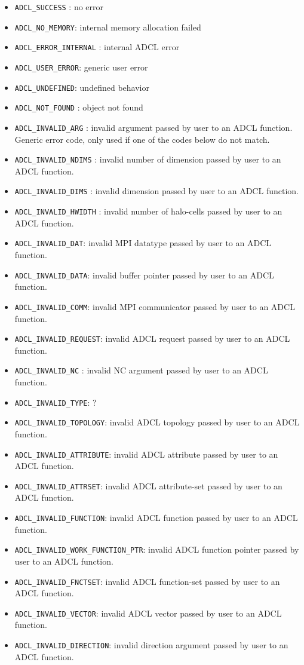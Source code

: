 \begin{itemize}
\item {\tt ADCL\_SUCCESS} : no error
\item {\tt ADCL\_NO\_MEMORY}: internal memory allocation failed
\item {\tt ADCL\_ERROR\_INTERNAL} : internal ADCL error
\item {\tt ADCL\_USER\_ERROR}: generic user error
\item {\tt ADCL\_UNDEFINED}: undefined behavior
\item {\tt ADCL\_NOT\_FOUND} : object not found

\item {\tt ADCL\_INVALID\_ARG} : invalid argument passed by user to an ADCL function. Generic error code, only used if one of the codes below do not match.
\item {\tt ADCL\_INVALID\_NDIMS} : invalid number of dimension passed by user to an ADCL function.
\item {\tt ADCL\_INVALID\_DIMS} : invalid dimension passed by user to an ADCL function.
\item {\tt ADCL\_INVALID\_HWIDTH} : invalid number of halo-cells passed by user to an ADCL function.
\item {\tt ADCL\_INVALID\_DAT}: invalid MPI datatype passed by user to an ADCL function.
\item {\tt ADCL\_INVALID\_DATA}: invalid buffer pointer passed by user to an ADCL function.
\item {\tt ADCL\_INVALID\_COMM}: invalid MPI communicator passed by user to an ADCL function.
\item {\tt ADCL\_INVALID\_REQUEST}: invalid ADCL request passed by user to an ADCL function.
\item {\tt ADCL\_INVALID\_NC} : invalid NC argument passed by user to an ADCL function.
\item {\tt ADCL\_INVALID\_TYPE}: ?
\item {\tt ADCL\_INVALID\_TOPOLOGY}: invalid ADCL topology passed by user to an ADCL function.
\item {\tt ADCL\_INVALID\_ATTRIBUTE}: invalid ADCL attribute passed by user to an ADCL function.
\item {\tt ADCL\_INVALID\_ATTRSET}: invalid ADCL attribute-set passed by user to an ADCL function.
\item {\tt ADCL\_INVALID\_FUNCTION}: invalid ADCL function passed by user to an ADCL function.
\item {\tt ADCL\_INVALID\_WORK\_FUNCTION\_PTR}: invalid ADCL function pointer passed by user to an ADCL function.
\item {\tt ADCL\_INVALID\_FNCTSET}: invalid ADCL function-set passed by user to an ADCL function.
\item {\tt ADCL\_INVALID\_VECTOR}: invalid ADCL vector passed by user to an ADCL function.
\item {\tt ADCL\_INVALID\_DIRECTION}: invalid direction argument passed by user to an ADCL function.
\end{itemize}